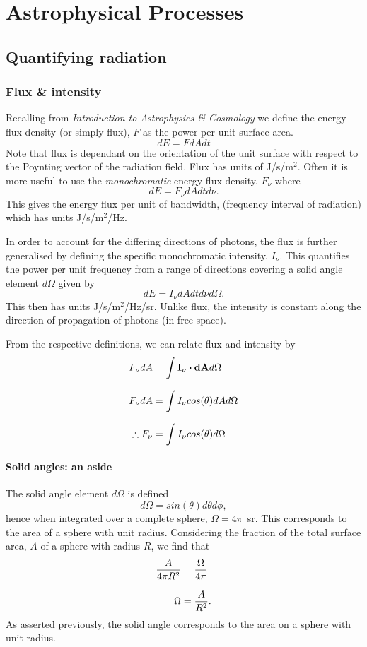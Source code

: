 \chapter{Astrophysical Processes}
\minitoc
\pagebreak
\section{Quantifying radiation}
\subsection{Flux \& intensity}
Recalling from \textit{Introduction to Astrophysics \& Cosmology} we define the energy flux density (or simply flux), $F$ as the power per unit surface area.
%
$$ dE = F dA dt $$
%
Note that flux is dependant on the orientation of the unit surface with respect to the Poynting vector of the radiation field.
 Flux has units of J/s/m$^2$.
 Often it is more useful to use the \emph{monochromatic} energy flux density, $F_\nu$ where
%
$$ dE = F_\nu dA dt d\nu. $$
%
This gives the energy flux per unit of bandwidth, (frequency interval of radiation) which has units J/s/m$^2$/Hz.
\par 
In order to account for the differing directions of photons, the flux is further generalised by defining the specific monochromatic intensity, $I_\nu$.
 This quantifies the power per unit frequency from a range of directions covering a solid angle element $d\Omega$ given by
%
$$ dE = I_\nu dA dt d\nu d\Omega. $$
%
This then has units J/s/m$^2$/Hz/sr.
 Unlike flux, the intensity is constant along the direction of propagation of photons (in free space).
\par
From the respective definitions, we can relate flux and intensity by
%
\begin{align*}
	F_\nu dA &= \int \mathbf{I_\nu} \dotp \mathbf{dA} d\Omega
	\linedrop
	F_\nu dA &= \int I_\nu cos(\theta) dA d\Omega
	\linedrop
	\therefore F_\nu &= \int I_\nu cos(\theta) d\Omega
\end{align*}
%

\subsubsection{Solid angles: an aside}
The solid angle element $d\Omega$ is defined
%
$$ d\Omega = sin(\theta) d\theta d\phi , $$
%
hence when integrated over a complete sphere, $\Omega = 4\pi$~sr.
 This corresponds to the area of a sphere with unit radius.
 Considering the fraction of the total surface area, $A$ of a sphere with radius $R$, we find that
%
\begin{align*}
	\frac{A}{4\pi R^2} &= \frac{\Omega}{4\pi}
	\linedrop
	\Omega &= \frac{A}{R^2}.
\end{align*}
%
As asserted previously, the solid angle corresponds to the area on a sphere with unit radius.

 
 
 
 
 
 
 
 
 
 
 
 